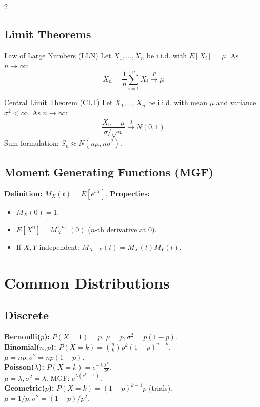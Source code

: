 \documentclass[10pt, letterpaper]{article}
\begin{document}
\begin{multicols*}{2}
\subsection{Limit Theorems}
\begin{theorbox}{Law of Large Numbers (LLN)}
Let $X_1, \dots, X_n$ be i.i.d. with $E[X_i] = \mu$. As $n \to \infty$:
$$ \bar{X}_n = \frac{1}{n} \sum_{i=1}^{n} X_i \xrightarrow{P} \mu $$
\end{theorbox}

\begin{theorbox}{Central Limit Theorem (CLT)}
Let $X_1, \dots, X_n$ be i.i.d. with mean $\mu$ and variance $\sigma^2 < \infty$. As $n \to \infty$:
$$ \frac{\bar{X}_n - \mu}{\sigma / \sqrt{n}} \xrightarrow{d} N(0, 1) $$
Sum formulation: $S_n \approx N(n\mu, n\sigma^2)$.
\end{theorbox}

\subsection{Moment Generating Functions (MGF)}
\textbf{Definition:} $M_X(t) = E[e^{tX}]$.
\textbf{Properties:}
\begin{itemize}
    \item $M_X(0) = 1$.
    \item $E[X^n] = M_X^{(n)}(0)$ ($n$-th derivative at 0).
    \item If $X, Y$ independent: $M_{X+Y}(t) = M_X(t)M_Y(t)$.
\end{itemize}

\section{Common Distributions}

\subsection{Discrete}
\textbf{Bernoulli($p$):} $P(X=1)=p$. $\mu=p, \sigma^2=p(1-p)$.
\\
\textbf{Binomial($n, p$):} $P(X=k) = \binom{n}{k} p^k (1-p)^{n-k}$.
\\ $\mu=np, \sigma^2=np(1-p)$.
\\
\textbf{Poisson($\lambda$):} $P(X=k) = e^{-\lambda} \frac{\lambda^k}{k!}$.
\\ $\mu=\lambda, \sigma^2=\lambda$. MGF: $e^{\lambda(e^t - 1)}$.
\\
\textbf{Geometric($p$):} $P(X=k) = (1-p)^{k-1}p$ (trials).
\\ $\mu=1/p, \sigma^2=(1-p)/p^2$.


\end{multicols*}
\end{document}
